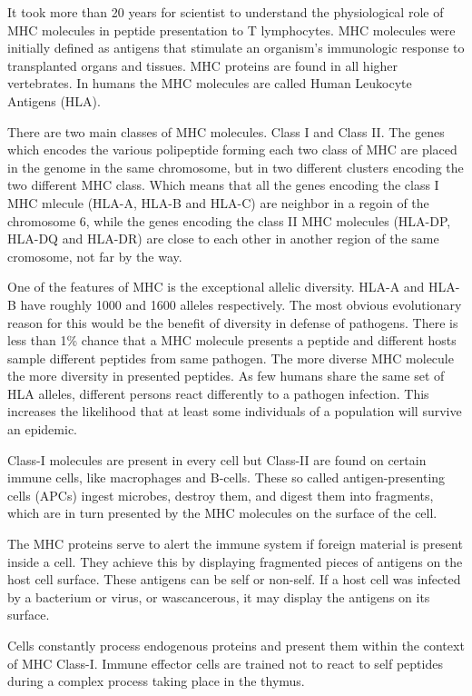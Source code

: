 
It took more than 20 years for scientist to understand the  physiological role of MHC molecules in peptide presentation to T lymphocytes. 
MHC molecules were initially defined as antigens that stimulate an organism’s immunologic response to transplanted organs and tissues. MHC proteins are found in all higher vertebrates. 
In humans the MHC molecules are called Human Leukocyte Antigens (HLA).

There are two main classes of MHC molecules. Class I and Class II. The genes which encodes the various polipeptide forming each two class of MHC are placed in the genome in the same chromosome, 
but in two different clusters encoding the two different MHC class. 
Which means that all the genes encoding the class I MHC mlecule (HLA-A, HLA-B and HLA-C) are neighbor in a regoin of the chromosome 6, 
while the genes encoding the class II MHC molecules (HLA-DP, HLA-DQ and HLA-DR) are close to each other in another region of the same cromosome, not far by the way.

One of the features of MHC is the exceptional allelic diversity. HLA-A and HLA-B have roughly 1000 and 1600 alleles respectively. 
The most obvious evolutionary reason for this would be the benefit of diversity in defense of pathogens. 
There is less than 1\% chance that a MHC molecule presents a peptide and different hosts sample different peptides from same pathogen. 
The more diverse MHC molecule the more diversity in presented peptides. As few humans share the same set of HLA alleles, different persons react differently to a pathogen infection. 
This increases the likelihood that at least some individuals of a population will survive an epidemic.

Class-I molecules are present in every cell but Class-II are found on certain immune cells, like macrophages and B-cells. 
These so called antigen-presenting cells (APCs) ingest microbes, destroy them, and digest them into fragments, which are in turn presented by the MHC molecules on the surface of the cell.

The MHC proteins serve to alert the immune system if foreign material is present inside a cell. 
They achieve this by displaying fragmented pieces of antigens on the host cell surface. These antigens can be self or non-self. 
If a host cell was infected by a bacterium or virus, or wascancerous, it may  display the antigens on its surface.

Cells constantly process endogenous proteins and present them within the context of MHC Class-I. 
Immune effector cells are trained not to react to self peptides during a complex process taking place in the thymus.

